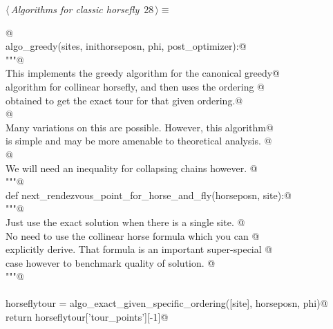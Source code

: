 \documentclass[11.5pt]{report}
\begin{document}
\begin{flushleft} \small\label{scrap35}\raggedright\small
{} $\langle\,${\itshape Algorithms for classic horsefly}\nobreak\ {\footnotesize {28}}$\,\rangle\equiv$
\vspace{-1ex}
\begin{list}{}{} \item
\mbox{}\verb@   @\\
\mbox{}\verb@def algo_greedy(sites, inithorseposn, phi, post_optimizer):@\\
\mbox{}\verb@      """@\\
\mbox{}\verb@      This implements the greedy algorithm for the canonical greedy@\\
\mbox{}\verb@      algorithm for collinear horsefly, and then uses the ordering @\\
\mbox{}\verb@      obtained to get the exact tour for that given ordering.@\\
\mbox{}\verb@      @\\
\mbox{}\verb@      Many variations on this are possible. However, this algorithm@\\
\mbox{}\verb@      is simple and may be more amenable to theoretical analysis. @\\
\mbox{}\verb@      @\\
\mbox{}\verb@      We will need an inequality for collapsing chains however. @\\
\mbox{}\verb@      """@\\
\mbox{}\verb@      def next_rendezvous_point_for_horse_and_fly(horseposn, site):@\\
\mbox{}\verb@            """@\\
\mbox{}\verb@            Just use the exact solution when there is a single site. @\\
\mbox{}\verb@            No need to use the collinear horse formula which you can @\\
\mbox{}\verb@            explicitly derive. That formula is  an important super-special @\\
\mbox{}\verb@            case however to benchmark quality of solution. @\\
\mbox{}\verb@            """@\\
\mbox{}\verb@@\\
\mbox{}\verb@            horseflytour = algo_exact_given_specific_ordering([site], horseposn, phi)@\\
\mbox{}\verb@            return horseflytour['tour_points'][-1]@\\

\end{list}
\end{flushleft}
\end{document}
